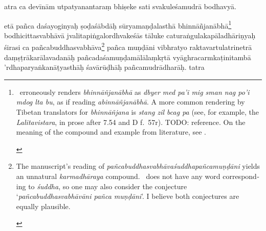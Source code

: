 \documentclass[naipra.tex]{subfiles}
\begin{document}
\begin{sanskrit}

\pstart
atra ca devīnām utpatyanantaraṃ bhiṣeke sati svakuleśamudrā bodhavyā. 
\pend


\pstart
etā pañca daśayoginyaḥ ṣoḍaśābdāḥ sūryamaṇḍalasthā bhinnāñjanābhā\footnote{\begin{english}
	\TIB\ erroneously renders \emph{bhinnāñjanābhā} as \emph{dbyer med pa'i mig sman nag po'i mdog lta bu}, as if reading \emph{abinnāñjanābhā}.
	A more common rendering by Tibetan translators for \emph{bhinnāñjana} is \emph{stang zil bcag pa} (see, for example, the \emph{Lalitavistara}, in prose after 7.54 and D f.\ 57r). TODO: reference.
	On the meaning of the compound and example from literature, see \cite{vogel1968}.
\end{english}} bodhicittasvabhāvā jvalitapiṅgalordhvakeśās tāluke caturaṅgulakapāladhāriṇyaḥ śirasi ca pañcabuddhasvabhāva\footnote{\begin{english}
	The manuscript's reading of \emph{pañcabuddhasvabhāvaśuddhapañcamuṇḍāni} yields an unnatural \emph{karmadhāraya} compound.
	\TIB\ does not have any word corresponding to \emph{śuddha}, so one may also consider the conjecture `\emph{pañcabuddhasvabhāvāni pañca muṇḍāni}'.
	I believe both conjectures are equally plausible.
\end{english}} pañca muṇḍāni vibhratyo raktavartulatrinetrā daṃṣṭrākarālavadanāḥ pañcadaśamuṇḍamālālaṃkṛtā vyāghracarmkaṭinitambā 
'rdhaparyaṅkanāṭyasthāḥ śavārūḍhāḥ pañcamudrādharāḥ.
tatra\Emdash
\pend


\end{sanskrit}
\end{document}
